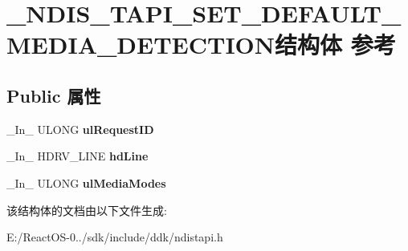 \hypertarget{struct___n_d_i_s___t_a_p_i___s_e_t___d_e_f_a_u_l_t___m_e_d_i_a___d_e_t_e_c_t_i_o_n}{}\section{\+\_\+\+N\+D\+I\+S\+\_\+\+T\+A\+P\+I\+\_\+\+S\+E\+T\+\_\+\+D\+E\+F\+A\+U\+L\+T\+\_\+\+M\+E\+D\+I\+A\+\_\+\+D\+E\+T\+E\+C\+T\+I\+O\+N结构体 参考}
\label{struct___n_d_i_s___t_a_p_i___s_e_t___d_e_f_a_u_l_t___m_e_d_i_a___d_e_t_e_c_t_i_o_n}
\subsection*{Public 属性}
\begin{DoxyCompactItemize}
\item 
\mbox{\label{struct___n_d_i_s___t_a_p_i___s_e_t___d_e_f_a_u_l_t___m_e_d_i_a___d_e_t_e_c_t_i_o_n_a47faa18258cd3d74d5f33edf637c26e7}} 
\+\_\+\+In\+\_\+ U\+L\+O\+NG {\bfseries ul\+Request\+ID}
\item 
\mbox{\label{struct___n_d_i_s___t_a_p_i___s_e_t___d_e_f_a_u_l_t___m_e_d_i_a___d_e_t_e_c_t_i_o_n_af8b09c5dca2da5856e25a72c3cf0e8cf}} 
\+\_\+\+In\+\_\+ H\+D\+R\+V\+\_\+\+L\+I\+NE {\bfseries hd\+Line}
\item 
\mbox{\label{struct___n_d_i_s___t_a_p_i___s_e_t___d_e_f_a_u_l_t___m_e_d_i_a___d_e_t_e_c_t_i_o_n_a091dc853f6fe70c655ad3f7519956dca}} 
\+\_\+\+In\+\_\+ U\+L\+O\+NG {\bfseries ul\+Media\+Modes}
\end{DoxyCompactItemize}


该结构体的文档由以下文件生成\+:\begin{DoxyCompactItemize}
\item 
E\+:/\+React\+O\+S-\/0../sdk/include/ddk/ndistapi.\+h\end{DoxyCompactItemize}
